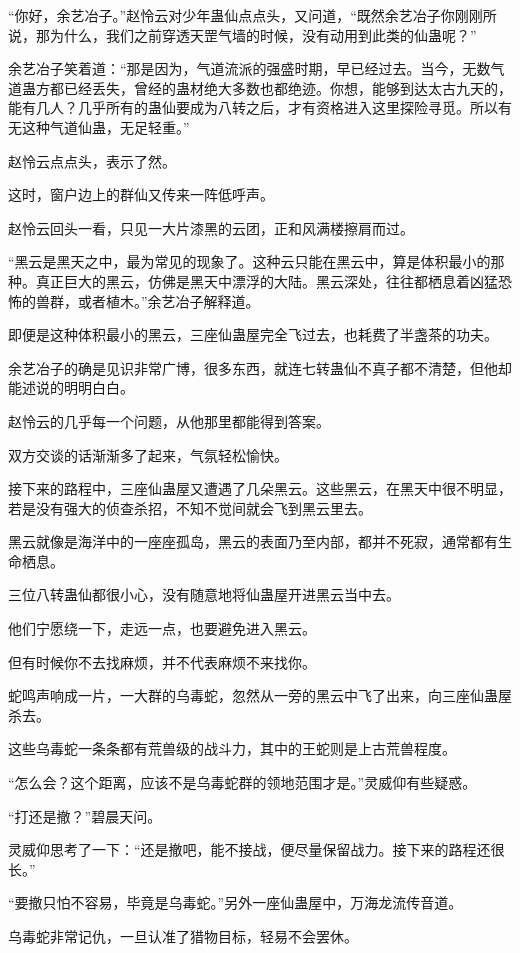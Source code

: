 \begin{this_body}
“你好，余艺冶子。”赵怜云对少年蛊仙点点头，又问道，“既然余艺冶子你刚刚所说，那为什么，我们之前穿透天罡气墙的时候，没有动用到此类的仙蛊呢？”

余艺冶子笑着道：“那是因为，气道流派的强盛时期，早已经过去。当今，无数气道蛊方都已经丢失，曾经的蛊材绝大多数也都绝迹。你想，能够到达太古九天的，能有几人？几乎所有的蛊仙要成为八转之后，才有资格进入这里探险寻觅。所以有无这种气道仙蛊，无足轻重。”

赵怜云点点头，表示了然。

这时，窗户边上的群仙又传来一阵低呼声。

赵怜云回头一看，只见一大片漆黑的云团，正和风满楼擦肩而过。

“黑云是黑天之中，最为常见的现象了。这种云只能在黑云中，算是体积最小的那种。真正巨大的黑云，仿佛是黑天中漂浮的大陆。黑云深处，往往都栖息着凶猛恐怖的兽群，或者植木。”余艺冶子解释道。

即便是这种体积最小的黑云，三座仙蛊屋完全飞过去，也耗费了半盏茶的功夫。

余艺冶子的确是见识非常广博，很多东西，就连七转蛊仙不真子都不清楚，但他却能述说的明明白白。

赵怜云的几乎每一个问题，从他那里都能得到答案。

双方交谈的话渐渐多了起来，气氛轻松愉快。

接下来的路程中，三座仙蛊屋又遭遇了几朵黑云。这些黑云，在黑天中很不明显，若是没有强大的侦查杀招，不知不觉间就会飞到黑云里去。

黑云就像是海洋中的一座座孤岛，黑云的表面乃至内部，都并不死寂，通常都有生命栖息。

三位八转蛊仙都很小心，没有随意地将仙蛊屋开进黑云当中去。

他们宁愿绕一下，走远一点，也要避免进入黑云。

但有时候你不去找麻烦，并不代表麻烦不来找你。

蛇鸣声响成一片，一大群的乌毒蛇，忽然从一旁的黑云中飞了出来，向三座仙蛊屋杀去。

这些乌毒蛇一条条都有荒兽级的战斗力，其中的王蛇则是上古荒兽程度。

“怎么会？这个距离，应该不是乌毒蛇群的领地范围才是。”灵威仰有些疑惑。

“打还是撤？”碧晨天问。

灵威仰思考了一下：“还是撤吧，能不接战，便尽量保留战力。接下来的路程还很长。”

“要撤只怕不容易，毕竟是乌毒蛇。”另外一座仙蛊屋中，万海龙流传音道。

乌毒蛇非常记仇，一旦认准了猎物目标，轻易不会罢休。


\end{this_body}
